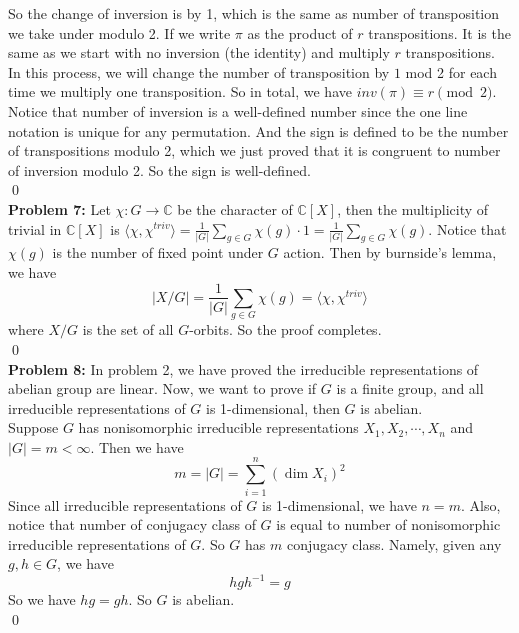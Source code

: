 \documentclass[12pt]{amsart}
\newcommand{\C}{\mathbb{C}}
\begin{document}
So the change of inversion is by 1, which is the same as number of transposition we take under modulo 2. If we write $\pi$ as the product of $r$ transpositions. It is the same as we start with no inversion (the identity) and multiply $r$ transpositions. In this process, we will change the number of transposition by $1$ mod 2 for each time we multiply one transposition. So in total, we have $inv(\pi)\equiv r\pmod 2$.\\
Notice that number of inversion is a well-defined number since the one line notation is unique for any permutation. And the sign is defined to be the number of transpositions modulo 2, which we just proved that it is congruent to number of inversion modulo 2. So the sign is well-defined.
\\\qed\\
\textbf{Problem 7:} Let $\chi:G\to \C$ be the character of $\C[X]$, then the multiplicity of trivial in $\C[X]$ is $\langle \chi, \chi^{triv}\rangle=\frac{1}{|G|}\sum_{g\in G}\chi(g)\cdot 1=\frac{1}{|G|}\sum_{g\in G}\chi(g)$. Notice that $\chi(g)$ is the number of fixed point under $G$ action. Then by burnside's lemma, we have 
\[|X/G|=\frac{1}{|G|}\sum_{g\in G}\chi(g)=\langle \chi, \chi^{triv}\rangle\]
where $X/G$ is the set of all $G$-orbits. So the proof completes.
\\\qed\\
\textbf{Problem 8:} In problem 2, we have proved the irreducible representations of abelian group are linear. Now, we want to prove if $G$ is a finite group, and all irreducible representations of $G$ is 1-dimensional, then $G$ is abelian.\\
Suppose $G$ has nonisomorphic irreducible representations $X_1,X_2,\cdots,X_n$ and $|G|=m<\infty$. Then we have 
\[m=|G|=\sum_{i=1}^n (\dim X_i)^2\]
Since all irreducible representations of $G$ is 1-dimensional, we have $n=m$. Also, notice that number of conjugacy class of $G$ is equal to number of nonisomorphic irreducible representations of $G$. So $G$ has $m$ conjugacy class. Namely, given any $g,h\in G$, we have 
\[hgh^{-1}=g\]
So we have $hg=gh$. So $G$ is abelian.
\\\qed\\
\end{document}
